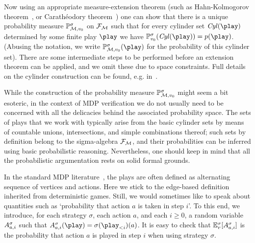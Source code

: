 Now using an appropriate measure-extension theorem
(such as Hahn-Kol\-mo\-go\-rov theorem~\cite[Corollary 2.5.4 and Proposition  2.5.7]{Rosenthal:2006}, or Carath\'eodory theorem~\cite[Theorem 1.3.10]{Ash&Doleans-Dade:2000}) one can show that there is a 
unique probability 
measure $\mathbb{P}^{\sigma}_{\mathcal{M},v_0} $ on $\mathcal{F}_{\mathcal{M}}$ such that for 
every cylinder set $\cylinder(\play)$ determined by some finite play $\play$ we have $\probm_{\vinit}^\sigma(\cylinder(\play))=\cylProb(\play)$. (Abusing the notation, we write $\probm^{\sigma}_{\mdp,\vinit}(\play)$ for the probability of this cylinder set). There 
are some intermediate steps to be performed before an extension theorem 
can be applied, and we omit these due to space constraints. Full details on the 
cylinder construction can be found, e.g. in~\cite{Ash&Doleans-Dade:2000,Novotny:2015}.

While the construction of the probability measure 
$\mathbb{P}^{\sigma}_{\mathcal{M},v_0}$ might seem a bit esoteric, in the context of 
MDP verification we do not usually need to be concerned with all the delicacies 
behind the associated probability space. The sets of plays that we work with 
typically arise from the basic cylinder sets by means of countable unions, 
intersections, and simple combinations thereof; such sets by definition belong 
to the 
sigma-algebra $\mathcal{F}_{\mathcal{M}}$, and their probabilities can be inferred using 
basic probabilistic reasoning. Nevertheless, one should keep in mind that all the 
probabilistic argumentation rests on solid formal grounds. 


In the standard MDP literature~\cite{Puterman:2005}, the plays are often defined as alternating sequence of vertices and actions. Here we stick to the edge-based definition inherited from deterministic games. Still, we would sometimes like to speak about quantities such as `probability that action $a$ is taken in step $i$'. To this end, we introduce, for each strategy $\sigma$, each action $a$,  and each $i\geq 0$,  a random variable $A^{\sigma}_{a,i}$ such that $\actevent{\sigma}{a}{i}(\play)=\sigma(\play_{< i})(a)$. It is easy to check that  $\mathbb{E}^\sigma_v[A^{\sigma}_{a,i}]$ is the probability that action $a$ is played in step $i$ when using strategy $\sigma$.

